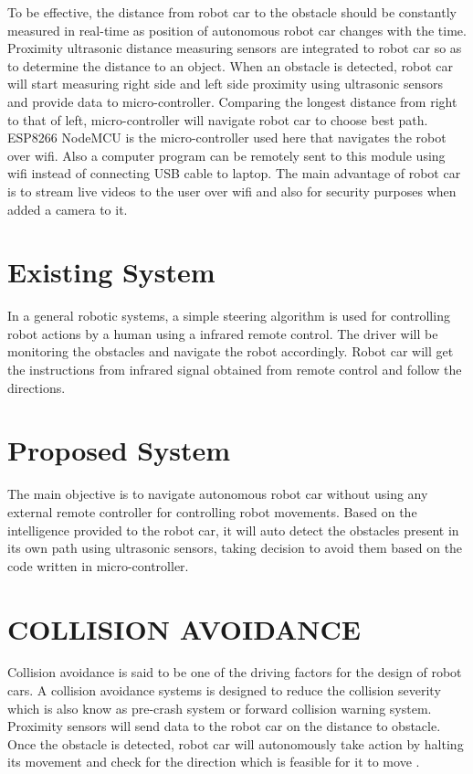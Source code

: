 \documentclass[sigconf]{acmart}
\begin{document}
To be effective, the distance from robot car to the obstacle should be constantly measured in real-time as position of autonomous robot car changes with the time.
Proximity ultrasonic distance measuring sensors are integrated to robot car so as to determine the distance to an object. When an obstacle is detected, robot car will start measuring right side and left side proximity using ultrasonic sensors and provide data to micro-controller. Comparing the longest distance from right to that of left, micro-controller will navigate robot car to choose best path. ESP8266 NodeMCU is the micro-controller used here that navigates the robot over wifi. Also a computer program can be remotely sent to this module using wifi instead of connecting USB cable to laptop. The main advantage of robot car is to stream live videos to the user over wifi and also for security purposes when added a camera to it.

\section{Existing System}
In a general robotic systems, a simple steering algorithm is used for controlling robot actions by a human using a infrared remote control. The driver will be monitoring the obstacles and navigate the robot accordingly. Robot car will get the instructions from infrared signal obtained from remote control and follow the directions.

\section{Proposed System}
The main objective is to navigate autonomous robot car without using any external remote controller for controlling robot movements. Based on the intelligence provided to the robot car, it will auto detect the obstacles present in its own path using ultrasonic sensors, taking decision to avoid them based on the code written in micro-controller.

\section{COLLISION AVOIDANCE}
Collision avoidance is said to be one of the driving factors for the design of robot cars. A collision avoidance systems is designed to reduce the collision severity which is also know as pre-crash system or forward collision warning system. Proximity sensors will send data to the robot car on the distance to obstacle. Once the obstacle is detected, robot  car will autonomously take action by halting its movement and check for the direction which is feasible for it to move \cite{stratis2009}. 
\end{document}

